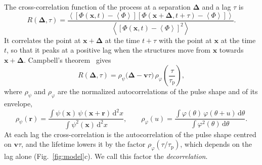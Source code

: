 \documentclass[aps,pre,11pt,a4paper,preprint,amsmath,amssymb,groupedaddress]{revtex4-2}
\newcommand{\Figref}[1]{Fig.~\ref{#1}}
\newcommand{\ave}[1]{{\left<#1\right>}}
\newcommand{\rmd}{\text{d}}
\newcommand{\br}{\ensuremath{\bm{x}}}
\newcommand{\bv}{\ensuremath{\bm{v}}}
\newcommand{\bD}{\ensuremath{\bm{\Delta}}}
\newcommand{\rpsi}{\ensuremath{\rho_\psi}}
\newcommand{\rphi}{\ensuremath{\rho_\varphi}}
\newcommand{\taud}{\ensuremath{\tau_\text{p}}}
\newcommand{\psh}{\ensuremath{\psi}}
\newcommand{\tlag}{\tau}
\begin{document}
The cross-correlation function of the process at a separation \bD{} and a lag $\tlag$ is
%
\begin{equation}
\label{eq:ccf_def}
R(\bD, \tlag) = \frac{\ave{\left[ \Phi(\br, t) - \ave{\Phi} \right] \left[ \Phi(\br + \bD, t + \tlag) - \ave{\Phi} \right]}}{\ave{\left[ \Phi(\br, t) - \ave{\Phi} \right]^2}}.
\end{equation}
%
It correlates the point at $\br + \bD$ at the time $t+\tlag$ with the point at \br{} at the time $t$, so that it peaks at a positive lag when the structures move from \br{} towards $\br+\bD$. Campbell's theorem~\cite{rice_mathematical_1944} gives
%
\begin{equation}
\label{eq:ccf_general}
R(\bD, \tlag) = \rpsi\big( \bD - \bv\tlag \big)\, \rphi\!\left( \frac{\tlag}{\taud} \right),
\end{equation}
%
where \rpsi{} and \rphi{} are the normalized autocorrelations of the pulse shape and of its envelope,
%
\begin{equation}
\rpsi(\bm{r}) = \frac{\int \psh(\br)\, \psh(\br + \bm{r})\, \rmd^2x}{\int \psh^2(\br)\, \rmd^2x},
\qquad
\rphi(u) = \frac{\int \varphi(\theta)\, \varphi(\theta + u)\, \rmd\theta}{\int \varphi^2(\theta)\, \rmd\theta}.
\end{equation}
%
At each lag the cross-correlation is the autocorrelation of the pulse shape centred on $\bv\tlag$, and the lifetime lowers it by the factor $\rphi(\tlag/\taud)$, which depends on the lag alone (\Figref{fig:model}c). We call this factor the \emph{decorrelation}.
\end{document}
